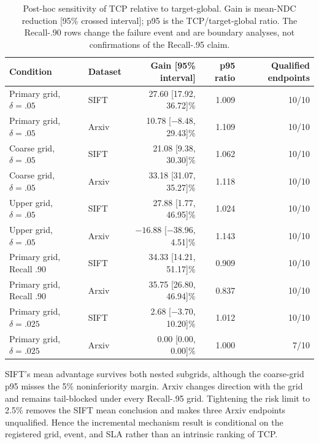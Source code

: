 \documentclass[sigconf,anonymous]{acmart}
\begin{document}
\begin{table}[t]
\caption{Post-hoc sensitivity of TCP relative to target-global. Gain is mean-NDC reduction [95\% crossed interval]; p95 is the TCP/target-global ratio. The Recall-.90 rows change the failure event and are boundary analyses, not confirmations of the Recall-.95 claim.}
\label{tab:equal-info-sensitivity}
\small\begin{tabular*}{\textwidth}{@{\extracolsep{\fill}}llrrr@{}}\toprule
Condition & Dataset & Gain [95\% interval] & p95 ratio & Qualified endpoints\\\midrule
Primary grid, $\delta=.05$ & SIFT & 27.60 [17.92, 36.72]\% & 1.009 & 10/10\\
Primary grid, $\delta=.05$ & Arxiv & 10.78 [$-8.48$, 29.43]\% & 1.109 & 10/10\\
Coarse grid, $\delta=.05$ & SIFT & 21.08 [9.38, 30.30]\% & 1.062 & 10/10\\
Coarse grid, $\delta=.05$ & Arxiv & 33.18 [31.07, 35.27]\% & 1.118 & 10/10\\
Upper grid, $\delta=.05$ & SIFT & 27.88 [1.77, 46.95]\% & 1.024 & 10/10\\
Upper grid, $\delta=.05$ & Arxiv & $-16.88$ [$-38.96$, 4.51]\% & 1.143 & 10/10\\
Primary grid, Recall .90 & SIFT & 34.33 [14.21, 51.17]\% & 0.909 & 10/10\\
Primary grid, Recall .90 & Arxiv & 35.75 [26.80, 46.94]\% & 0.837 & 10/10\\
Primary grid, $\delta=.025$ & SIFT & 2.68 [$-3.70$, 10.20]\% & 1.012 & 10/10\\
Primary grid, $\delta=.025$ & Arxiv & 0.00 [0.00, 0.00]\% & 1.000 & 7/10\\\bottomrule
\end{tabular*}
\end{table}

SIFT's mean advantage survives both nested subgrids, although the coarse-grid p95 misses the 5\% noninferiority margin. Arxiv changes direction with the grid and remains tail-blocked under every Recall-.95 grid. Tightening the risk limit to 2.5\% removes the SIFT mean conclusion and makes three Arxiv endpoints unqualified. Hence the incremental mechanism result is conditional on the registered grid, event, and SLA rather than an intrinsic ranking of TCP.
\end{document}
